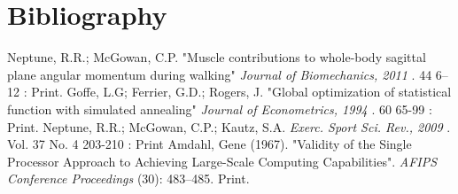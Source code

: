 



\section{Bibliography}

\begin{thebibliography}{99}
 Neptune, R.R.; McGowan, C.P. 
	"Muscle contributions to whole-body sagittal plane angular momentum during walking" 
	{ \em Journal of Biomechanics, 2011 }. 44 6–12 : Print.
 Goffe, L.G; Ferrier, G.D.; Rogers, J. 
	"Global optimization of statistical function with simulated annealing"
	{ \em Journal of Econometrics, 1994 }. 60 65-99 : Print.
 Neptune, R.R.; McGowan, C.P.; Kautz, S.A.
	{ \em Exerc. Sport Sci. Rev., 2009 }. Vol. 37 No. 4 203-210 : Print
 Amdahl, Gene (1967). "Validity of the Single Processor Approach to Achieving Large-Scale Computing Capabilities". {\em AFIPS Conference Proceedings} (30): 483–485. Print.
\end{thebibliography}
